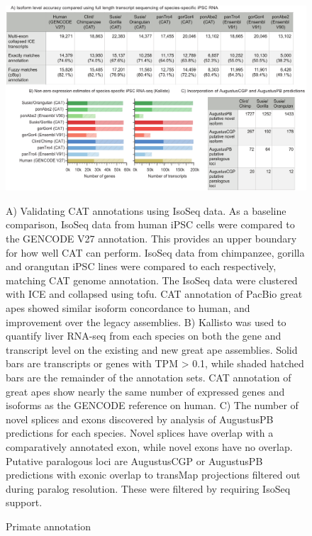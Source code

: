 \documentclass[fleqn,10pt]{wlscirep}
\begin{document}
\begin{figure}
\centering
\includegraphics[width=\textwidth,height=\textheight,keepaspectratio]{figure2-primate_v6.pdf}
\caption{Primate annotation}
A) Validating CAT annotations using IsoSeq data. As a baseline comparison, IsoSeq data from human iPSC cells were compared to the GENCODE V27 annotation. This provides an upper boundary for how well CAT can perform. IsoSeq data from chimpanzee,  gorilla and orangutan iPSC lines were compared to each respectively, matching CAT genome annotation.  The IsoSeq data were clustered with ICE and collapsed using tofu\cite{gordon2015widespread}. CAT annotation of PacBio great apes showed similar isoform concordance to human, and improvement over the legacy assemblies. B) Kallisto\cite{bray2015near} was used to quantify liver RNA-seq from each species on both the gene and transcript level on the existing and new great ape assemblies. Solid bars are transcripts or genes with TPM > 0.1, while shaded hatched bars are the remainder of the annotation sets. CAT annotation of great apes show nearly the same number of expressed genes and isoforms as the GENCODE reference on human. C) The number of novel splices and exons discovered by analysis of AugustusPB predictions for each species. Novel splices have overlap with a comparatively annotated exon, while novel exons have no overlap. Putative paralogous loci are AugustusCGP or AugustusPB predictions with exonic overlap to transMap projections filtered out during paralog resolution. These were filtered by requiring IsoSeq support.
\label{fig:fig2}
\end{figure}
\end{document}
